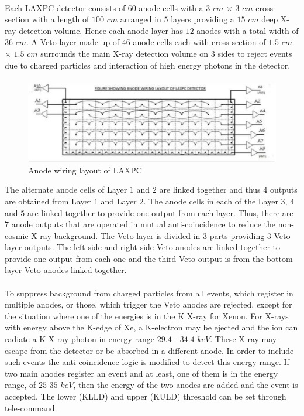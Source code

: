 \documentclass[a4paper,twoside]{report}
\numberwithin{equation}{section}
\begin{document}
\paragraph{}
Each LAXPC detector consists of $60$ anode cells with a  $3$ $cm$ $\times$ $3$ $cm$ cross section with a length of $100$ $cm$ arranged in $5$ layers providing a $15$ $cm$ deep X-ray detection volume. Hence each anode layer has $12$ anodes with a total width of $36$ $cm$. A Veto layer made up of $46$ anode cells each with cross-section of $1.5$ $cm$ $\times$ $1.5$ $cm$ surrounds the main X-ray detection volume on $3$ sides to reject events due to charged particles and interaction of high energy photons in the detector. 
\paragraph{}
\begin{figure}
\includegraphics[width=1.0\linewidth]{Anode_wiring_layout_LAXPC.jpg} 
\caption{Anode wiring layout of LAXPC}
\label{fig:Anode wiring layout LAXPC}
\end{figure}
The alternate anode cells of Layer $1$ and $2$ are linked together and thus $4$ outputs are obtained from Layer $1$ and Layer $2$. The anode cells in each of the Layer $3$, $4$ and $5$ are linked together to provide one output from each layer. Thus, there are $7$ anode outputs that are operated in mutual anti-coincidence to reduce the non-cosmic X-ray background. The Veto layer is divided in $3$ parts providing $3$ Veto layer outputs. The left side and right side Veto anodes are linked together to provide one output from each one and the third Veto output is from the bottom layer Veto anodes linked together.
\paragraph{}
To suppress background from charged particles from all events, which register in multiple anodes, or those, which trigger the Veto anodes are rejected, except for the situation where one of the energies is in the K X-ray for Xenon. For X-rays with energy above the K-edge of Xe, a K-electron may be ejected and the ion can radiate a K X-ray photon in energy range $29.4$ - $34.4$ $keV$. These X-ray may escape from the detector or be absorbed in a different anode. In order to include such events the anti-coincidence logic is modified to detect this energy range. If two main anodes register an event and at least, one of them is in the energy range, of $25$-$35$ $keV$, then the energy of the two anodes are added and the event is accepted. The lower (KLLD) and upper (KULD) threshold can be set through tele-command.
\end{document}
